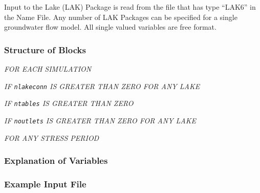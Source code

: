 Input to the Lake (LAK) Package is read from the file that has type ``LAK6'' in the Name File.  Any number of LAK Packages can be specified for a single groundwater flow model.  All single valued variables are free format.

\vspace{5mm}
\subsubsection{Structure of Blocks}
\vspace{5mm}

\noindent \textit{FOR EACH SIMULATION}



\noindent \textit{IF \texttt{nlakeconn} IS GREATER THAN ZERO FOR ANY LAKE}

\noindent \textit{IF \texttt{ntables} IS GREATER THAN ZERO}

\noindent \textit{IF \texttt{noutlets} IS GREATER THAN ZERO FOR ANY LAKE}


\vspace{5mm}
\noindent \textit{FOR ANY STRESS PERIOD}


\vspace{5mm}
\subsubsection{Explanation of Variables}
\begin{description}

\end{description}

\vspace{5mm}
\subsubsection{Example Input File}


\vspace{5mm}
